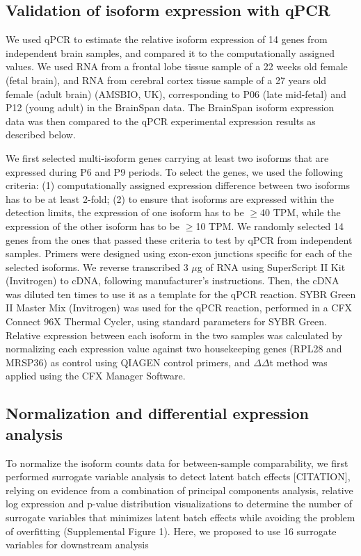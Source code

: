 \subsection{Validation of isoform expression with qPCR}
We used qPCR to estimate the relative isoform expression of 14 genes from independent brain samples, and compared it to the computationally assigned values. We used RNA from a frontal lobe tissue sample of a 22 weeks old female (fetal brain), and RNA from cerebral cortex tissue sample of a 27 years old female (adult brain) (AMSBIO, UK), corresponding to P06 (late mid-fetal) and P12 (young adult) in the BrainSpan data. The BrainSpan isoform expression data was then compared to the qPCR experimental expression results as described below. \par

We first selected multi-isoform genes carrying at least two isoforms that are expressed during P6 and P9 periods. To select the genes, we used the following criteria: (1) computationally assigned expression difference between two isoforms has to be at least 2-fold; (2) to ensure that isoforms are expressed within the detection limits, the expression of one isoform has to be $\geq$40 TPM, while the expression of the other isoform has to be $\geq$10 TPM. We randomly selected 14 genes from the ones that passed these criteria to test by qPCR from independent samples. Primers were designed using exon-exon junctions specific for each of the selected isoforms. We reverse transcribed 3 $\mu$g of RNA using SuperScript II Kit (Invitrogen) to cDNA, following manufacturer’s instructions. Then, the cDNA was diluted ten times to use it as a template for the qPCR reaction. SYBR Green II Master Mix (Invitrogen) was used for the qPCR reaction, performed in a CFX Connect 96X Thermal Cycler, using standard parameters for SYBR Green. Relative expression between each isoform in the two samples was calculated by normalizing each expression value against two housekeeping genes (RPL28 and MRSP36) as control using QIAGEN control primers, and $\Delta\Delta$t method was applied using the CFX Manager Software.

\subsection{Normalization and differential expression analysis}
To normalize the isoform counts data for between-sample comparability, we first performed surrogate variable analysis to detect latent batch effects [CITATION], relying on evidence from a combination of principal components analysis, relative log expression and p-value distribution visualizations to determine the number of surrogate variables that minimizes latent batch effects while avoiding the problem of overfitting (Supplemental Figure 1). Here, we proposed to use 16 surrogate variables for downstream analysis\par

